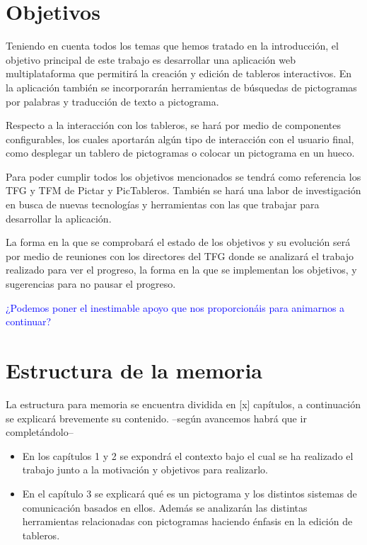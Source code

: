 \section{Objetivos}
\label{cap1:sec:Objetivos}

Teniendo en cuenta todos los temas que hemos tratado en la introducción, el objetivo principal de este trabajo es desarrollar una aplicación web multiplataforma que permitirá la creación y edición de tableros interactivos. En la aplicación también se incorporarán herramientas de búsquedas de pictogramas por palabras y traducción de texto a pictograma. 

Respecto a la interacción con los tableros, se hará por medio de componentes configurables, los cuales aportarán algún tipo de interacción con el usuario final, como desplegar un tablero de pictogramas o colocar un pictograma en un hueco.

Para poder cumplir todos los objetivos mencionados se tendrá como referencia los TFG y TFM de Pictar y PicTableros. También se hará una labor de investigación en busca de nuevas tecnologías y herramientas con las que trabajar para desarrollar la aplicación. 

La forma en la que se comprobará el estado de los objetivos y su evolución será por medio de reuniones con los directores del TFG donde se analizará el trabajo realizado para ver el progreso, la forma en la que se implementan los objetivos, y sugerencias para no pausar el progreso.

\textcolor{blue}{¿Podemos poner el inestimable apoyo que nos proporcionáis para animarnos a continuar?}





\section{Estructura de la memoria}
\label{cap1:sec:Estructura}

La estructura para memoria se encuentra dividida en [x] capítulos, a continuación se explicará brevemente su contenido. --según avancemos habrá que ir completándolo--
\begin{itemize}
	\item En los capítulos 1 y 2 se expondrá el contexto bajo el cual se ha realizado el trabajo junto a la motivación y objetivos para realizarlo.
	\item En el capítulo 3 se explicará qué es un pictograma y los distintos sistemas de comunicación basados en ellos. Además se analizarán las distintas herramientas relacionadas con pictogramas haciendo énfasis en la edición de tableros.
\end{itemize}	




